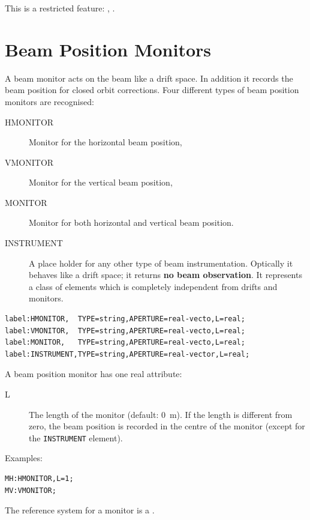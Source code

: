This is a restricted feature: \noopalt, \noopalcycl .

\section{Beam Position Monitors}
\label{sec:monitors}
A beam monitor acts on the beam like a drift space.
In addition it records the beam position for closed orbit
corrections. 
Four different types of beam position monitors are recognised:
\begin{description}
\item[HMONITOR]
  \label{sec:hmonitor}
  Monitor for the horizontal beam position,
\item[VMONITOR]
  \label{sec:vmonitor}
  Monitor for the vertical beam position,
\item[MONITOR]
  \label{sec:monitor}
  Monitor for both horizontal and vertical beam position.
\item[INSTRUMENT]
  \label{sec:instrument}
  A place holder for any other type of beam instrumentation.
  Optically it behaves like a drift space;
  it returns \textbf{no beam observation}.
  It represents a class of elements
  which is completely independent from drifts and monitors.
\end{description}
\begin{verbatim}
label:HMONITOR,  TYPE=string,APERTURE=real-vecto,L=real;
label:VMONITOR,  TYPE=string,APERTURE=real-vecto,L=real;
label:MONITOR,   TYPE=string,APERTURE=real-vecto,L=real;
label:INSTRUMENT,TYPE=string,APERTURE=real-vector,L=real;
\end{verbatim}
A beam position monitor has one real attribute:
\begin{description}
\item[L]
  The length of the monitor (default: 0~m). 
  If the length is different from zero,
  the beam position is recorded in the centre of the monitor
  (except for the \texttt{INSTRUMENT} element).
\end{description}
\noindent Examples:
\begin{verbatim}
MH:HMONITOR,L=1;
MV:VMONITOR;
\end{verbatim}
The reference system for a monitor is a 
.
